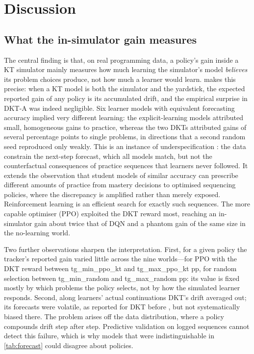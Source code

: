 \section{Discussion}\label{sec:discussion}

\subsection{What the in-simulator gain measures}

The central finding is that, on real programming data, a policy's gain inside a KT simulator mainly measures how much learning the simulator's model \emph{believes} its problem choices produce, not how much a learner would learn.  makes this precise: when a KT model is both the simulator and the yardstick, the expected reported gain of any policy is its accumulated drift, and the empirical surprise in DKT-A was indeed negligible. Six learner models with equivalent forecasting accuracy implied very different learning: the explicit-learning models attributed small, homogeneous gains to practice, whereas the two DKTs attributed gains of several percentage points to single problems, in directions that a second random seed reproduced only weakly. This is an instance of underspecification \citep{damour2022underspecification}: the data constrain the next-step forecast, which all models match, but not the counterfactual consequences of practice sequences that learners never followed. It extends the observation that student models of similar accuracy can prescribe different amounts of practice \citep{lee2012individualizing,rollinson2015predictive} from mastery decisions to optimised sequencing policies, where the discrepancy is amplified rather than merely exposed. Reinforcement learning is an efficient search for exactly such sequences. The more capable optimiser (PPO) exploited the DKT reward most, reaching an in-simulator gain about twice that of DQN and a phantom gain of the same size in the no-learning world.

Two further observations sharpen the interpretation. First, for a given policy the tracker's reported gain varied little across the nine worlds---for PPO with the DKT reward between {{tg_min_ppo_kt}} and {{tg_max_ppo_kt}} pp, for random selection between {{tg_min_random}} and {{tg_max_random}} pp: its value is fixed mostly by which problems the policy selects, not by how the simulated learner responds. Second, along learners' actual continuations DKT's drift averaged out; its forecasts were volatile, as reported for DKT before \citep{yeung2018dktplus}, but not systematically biased there. The problem arises off the data distribution, where a policy compounds drift step after step. Predictive validation on logged sequences cannot detect this failure, which is why models that were indistinguishable in \cref{tab:forecast} could disagree about policies.

